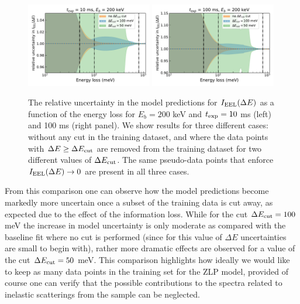 \begin{figure}[t]
    \centering
    \includegraphics[width=0.49\textwidth]{plots/prediction_with_cut_10ms.pdf}
    \includegraphics[width=0.49\textwidth]{plots/prediction_with_cut_100ms.pdf}
    \caption{\small The relative uncertainty in the model predictions for $I_{\rm EEL}(\Delta E)$
      as a function of the energy loss for $E_b=200$ keV and $t_{\rm exp}=10$ ms (left)
      and 100 ms (right panel).
      We show results for three different cases: without any cut
      in the training dataset, and where the data points with $\Delta E \ge \Delta E_{\rm cut}$
      are removed from the training dataset for two different values
      of $\Delta E_{\rm cut}$.
      The same pseudo-data points that enforce $I_{\rm EEL}(\Delta E)\to 0$ are present
      in all three cases.
      \label{fig:EELS_vacuum_DeltaE_unc}}
\end{figure}


From this comparison one can observe how the model predictions become markedly more uncertain
once a subset of the training data is cut away, as expected due to the effect of the information
loss.
%
While for the cut $\Delta E_{\rm cut}=100$ meV the increase in model uncertainty is only moderate
as compared with the baseline fit where no cut is performed (since for this value of $\Delta E$
uncertainties are small to begin with), rather more dramatic effects are observed
for a value of the cut $\Delta E_{\rm cut}=50$ meV.
%
This comparison highlights how ideally we would like to keep as many data points
in the training set for the ZLP model, provided of course one can verify that the
possible contributions to the spectra related to inelastic scatterings from the
sample can be neglected.

